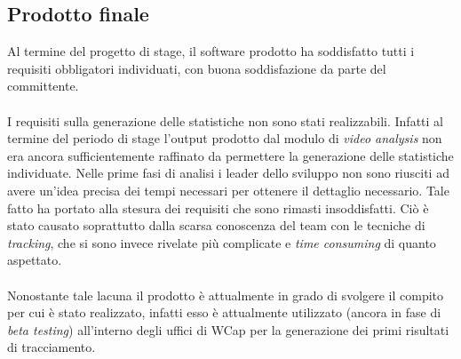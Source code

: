 \subsection{Prodotto finale}
Al termine del progetto di stage, il software prodotto ha soddisfatto tutti i requisiti obbligatori individuati, con buona soddisfazione da parte del committente. \\ \\
I requisiti sulla generazione delle statistiche non sono stati realizzabili. Infatti al termine del periodo di stage l'output prodotto dal modulo di \textit{video analysis} non era ancora sufficientemente raffinato da permettere la generazione delle statistiche individuate. Nelle prime fasi di analisi i leader dello sviluppo non sono riusciti ad avere un'idea precisa dei tempi necessari per ottenere il dettaglio necessario. Tale fatto ha portato alla stesura dei requisiti che sono rimasti insoddisfatti. Ciò è stato causato soprattutto dalla scarsa conoscenza del team con le tecniche di \textit{tracking}, che si sono invece rivelate più complicate e \textit{time consuming} di quanto aspettato. \\ \\
Nonostante tale lacuna il prodotto è attualmente in grado di svolgere il compito per cui è stato realizzato, infatti esso è attualmente utilizzato (ancora in fase di \textit{beta testing}) all'interno degli uffici di WCap per la generazione dei primi risultati di tracciamento.

